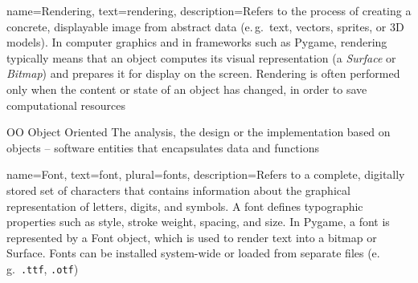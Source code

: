 {
	name={Rendering},
	text={rendering},
	description={Refers to the process of creating a concrete, displayable image from abstract data (e.\,g.\ text, vectors, sprites, or 3D models). In computer graphics and in frameworks such as Pygame, rendering typically means that an object computes its visual representation (a \emph{Surface} or \emph{Bitmap}) and prepares it for display on the screen. Rendering is often performed only when the content or state of an object has changed, in order to save computational resources}
}


	{OO}            %
	{Object Oriented}  %
	{The analysis, the design or the implementation based on objects -- software entities that encapsulates data and functions} %


{
	name={Font},
	text={font},
	plural={fonts},
	description={Refers to a complete, digitally stored set of characters that contains information	about the graphical representation of letters, digits, and symbols. A font defines typographic properties such as style, stroke weight, spacing, and size. In Pygame, a font is represented by a Font object, which is used to render text into a bitmap or Surface. Fonts can be installed system-wide or loaded from separate files (e.\,g.\ \texttt{.ttf}, \texttt{.otf})}
}


